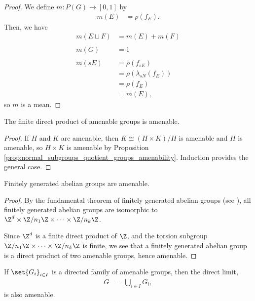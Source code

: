 \begin{proof}
  We define $m\colon P(G)\rightarrow [0,1]$ by
  \begin{align*}
    m(E) &= \rho\left(f_E\right).
  \end{align*}
  Then, we have
  \begin{align*}
    m\left(E\sqcup F\right) &= m(E) + m(F)\\
                            \\
    m\left(G\right) &= 1\\
    \\
    m\left(sE\right) &= \rho\left(f_{sE}\right)\\
                     &= \rho\left(\lambda_{sN}\left(f_{E}\right)\right)\\
                     &= \rho\left(f_E\right)\\
                     &= m(E),
  \end{align*}
  so $m$ is a mean.
\end{proof}
\begin{corollary}
  The finite direct product of amenable groups is amenable.
\end{corollary}
\begin{proof}
  If $H$ and $K$ are amenable, then $K\cong \left(H\times K\right)/H$ is amenable and $H$ is amenable, so $H\times K$ is amenable by Proposition \ref{prop:normal_subgroups_quotient_groups_amenability}. Induction provides the general case.
\end{proof}
\begin{corollary}\label{cor:finitely_generated_amenable}
  Finitely generated abelian groups are amenable.
\end{corollary}
\begin{proof}
  By the fundamental theorem of finitely generated abelian groups (see \cite[158]{dummit_and_foote}), all finitely generated abelian groups are isomorphic to $\Z^{d}\times \Z/n_1\Z\times\cdots\times \Z/{n_k}\Z$.\newline

  Since $\Z^{d}$ is a finite direct product of $\Z$, and the torsion subgroup $\Z/n_1\Z\times\cdots\times \Z/n_k\Z$ is finite, we see that a finitely generated abelian group is a direct product of two amenable groups, hence amenable.
\end{proof}
\begin{corollary}\label{cor:direct_limit_amenable}
  If $\set{G_i}_{i\in I}$ is a directed family of amenable groups, then the direct limit,
  \begin{align*}
    G &= \bigcup_{i\in I}G_i,
  \end{align*}
  is also amenable.
\end{corollary}
